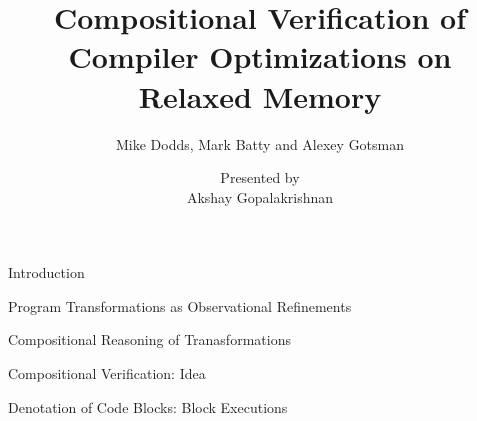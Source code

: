 \documentclass[xcolor=dvipsnames, notes]{beamer}
\title{Compositional Verification of Compiler Optimizations on Relaxed Memory}
\subtitle{Mike Dodds, Mark Batty and Alexey Gotsman}
\author{Presented by \\ Akshay Gopalakrishnan}
\begin{document}
    
    \begin{frame}

        \maketitle
    \end{frame}

    \begin{frame}{Introduction}
        

    \end{frame}

    \begin{frame}{Program Transformations as Observational Refinements}
    

    \end{frame}

    \begin{frame}{Compositional Reasoning of Tranasformations}


    \end{frame}

    \begin{frame}{Compositional Verification: Idea}


    \end{frame}


    \begin{frame}{Denotation of Code Blocks: Block Executions} 



    \end{frame}
\end{document}
